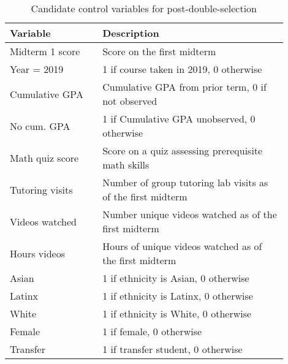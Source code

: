 \begin{spacing}{1.0} 
\begin{table} \centering \caption{Candidate control variables for post-double-selection} 
\label{controlvars_desc} 
\begin{threeparttable} 
\begin{tabular}{p{0.3\linewidth} p{0.6\linewidth}}
\toprule
       Variable &                                                 Description \\
\midrule
Midterm 1 score &                                  Score on the first midterm \\
    Year = 2019 &                      1 if course taken in 2019, 0 otherwise \\
 Cumulative GPA &           Cumulative GPA from prior term, 0 if not observed \\
    No cum. GPA &                 1 if Cumulative GPA unobserved, 0 otherwise \\
Math quiz score &          Score on a quiz assessing prerequisite math skills \\
Tutoring visits & Number of group tutoring lab visits as of the first midterm \\
 Videos watched &        Number unique videos watched as of the first midterm \\
   Hours videos &      Hours of unique videos watched as of the first midterm \\
          Asian &                        1 if ethnicity is Asian, 0 otherwise \\
         Latinx &                       1 if ethnicity is Latinx, 0 otherwise \\
          White &                        1 if ethnicity is White, 0 otherwise \\
         Female &                                    1 if female, 0 otherwise \\
       Transfer &                          1 if transfer student, 0 otherwise \\
\bottomrule
\end{tabular}
\end{threeparttable}
\end{table} 
\end{spacing}